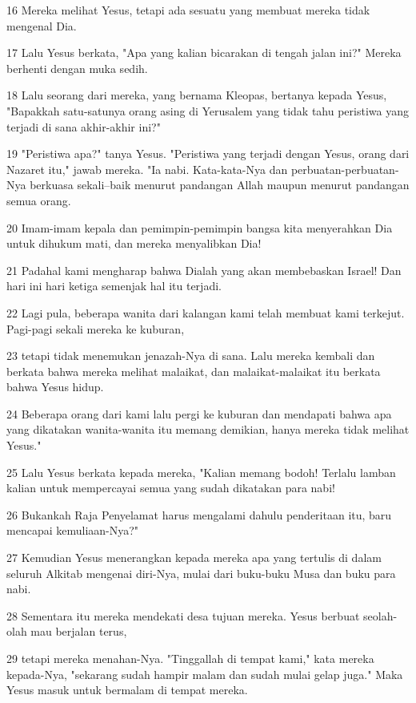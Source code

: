 \par 16 Mereka melihat Yesus, tetapi ada sesuatu yang membuat mereka tidak mengenal Dia.
\par 17 Lalu Yesus berkata, "Apa yang kalian bicarakan di tengah jalan ini?" Mereka berhenti dengan muka sedih.
\par 18 Lalu seorang dari mereka, yang bernama Kleopas, bertanya kepada Yesus, "Bapakkah satu-satunya orang asing di Yerusalem yang tidak tahu peristiwa yang terjadi di sana akhir-akhir ini?"
\par 19 "Peristiwa apa?" tanya Yesus. "Peristiwa yang terjadi dengan Yesus, orang dari Nazaret itu," jawab mereka. "Ia nabi. Kata-kata-Nya dan perbuatan-perbuatan-Nya berkuasa sekali--baik menurut pandangan Allah maupun menurut pandangan semua orang.
\par 20 Imam-imam kepala dan pemimpin-pemimpin bangsa kita menyerahkan Dia untuk dihukum mati, dan mereka menyalibkan Dia!
\par 21 Padahal kami mengharap bahwa Dialah yang akan membebaskan Israel! Dan hari ini hari ketiga semenjak hal itu terjadi.
\par 22 Lagi pula, beberapa wanita dari kalangan kami telah membuat kami terkejut. Pagi-pagi sekali mereka ke kuburan,
\par 23 tetapi tidak menemukan jenazah-Nya di sana. Lalu mereka kembali dan berkata bahwa mereka melihat malaikat, dan malaikat-malaikat itu berkata bahwa Yesus hidup.
\par 24 Beberapa orang dari kami lalu pergi ke kuburan dan mendapati bahwa apa yang dikatakan wanita-wanita itu memang demikian, hanya mereka tidak melihat Yesus."
\par 25 Lalu Yesus berkata kepada mereka, "Kalian memang bodoh! Terlalu lamban kalian untuk mempercayai semua yang sudah dikatakan para nabi!
\par 26 Bukankah Raja Penyelamat harus mengalami dahulu penderitaan itu, baru mencapai kemuliaan-Nya?"
\par 27 Kemudian Yesus menerangkan kepada mereka apa yang tertulis di dalam seluruh Alkitab mengenai diri-Nya, mulai dari buku-buku Musa dan buku para nabi.
\par 28 Sementara itu mereka mendekati desa tujuan mereka. Yesus berbuat seolah-olah mau berjalan terus,
\par 29 tetapi mereka menahan-Nya. "Tinggallah di tempat kami," kata mereka kepada-Nya, "sekarang sudah hampir malam dan sudah mulai gelap juga." Maka Yesus masuk untuk bermalam di tempat mereka.
